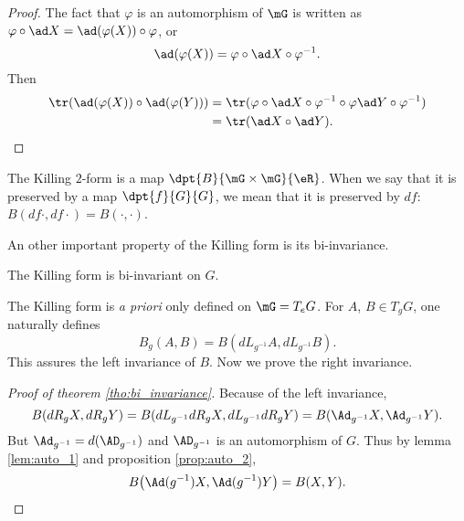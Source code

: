 \begin{proof}
The fact that $\varphi$ is an automorphism of $\mG$ is written as $\varphi\circ\ad X=\ad(\varphi(X))\circ\varphi$, or
\[
  \ad(\varphi(X))=\varphi\circ\ad X\circ\varphi^{-1}.
\]
Then
\begin{equation}
\begin{split}
\tr(\ad(\varphi(X))\circ\ad(\varphi(Y)))&=\tr(\varphi\circ\ad X\circ\varphi^{-1}\circ\varphi\ad Y\circ\varphi^{-1})\\
                                &=\tr(\ad X\circ\ad Y).
\end{split}
\end{equation}
\end{proof}


\begin{remark}
The Killing $2$-form is a map $\dpt{B}{\mG\times\mG}{\eR}$. When we say that it is preserved by a map $\dpt{f}{G}{G}$, we mean that it is preserved by $df$: $B(df\cdot,df\cdot)=B(\cdot,\cdot)$.
\end{remark}

An other important property of the Killing form is its bi-invariance.

\begin{theorem}
The Killing form is bi-invariant on $G$.
\label{tho:bi_invariance}
\end{theorem}

\begin{remark}
The Killing form is \emph{a priori} only defined on $\mG=T_eG$. For $A$, $B\in T_gG$, one naturally defines
\begin{equation}
  B_g(A,B)=B(dL_{g^{-1}}A,dL_{g^{-1}}B).
\end{equation}
This assures the left invariance of $B$. Now we prove the right invariance.
\end{remark}


\begin{proof}[Proof of theorem \ref{tho:bi_invariance}]
Because of the left invariance,
\[
  B(dR_gX,dR_gY)=B(dL_{g^{-1}}dR_gX,dL_{g^{-1}}dR_gY)=B(\Ad_{g^{-1}}X,\Ad_{g^{-1}}Y).
\]
But $\Ad_{g^{-1}}=d(\AD_{g^{-1}})$ and $\AD_{g^{-1}}$ is an automorphism of $G$. Thus by lemma \ref{lem:auto_1} and proposition \ref{prop:auto_2},
\begin{equation}                    \label{eq_KillAdinvariant}
B\big(\Ad(g^{-1})X,\Ad(g^{-1})Y\big)=B(X,Y).
\end{equation}

\end{proof}

